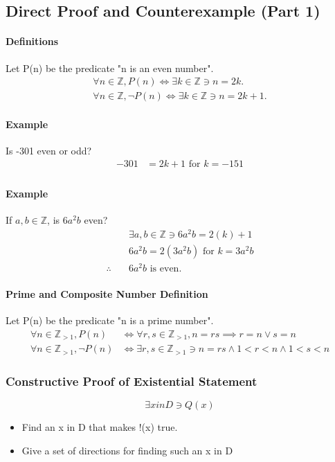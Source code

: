 \subsection{Direct Proof and Counterexample (Part 1)}
\hrulefill

\paragraph*{Definitions}
Let P(n) be the predicate "n is an even number".
\begin{align*}
    \forall n \in \mathbb{Z}, P(n) \iff \exists k \in \mathbb{Z} \ni n = 2k.\\
    \forall n \in \mathbb{Z}, \neg P(n) \iff \exists k \in \mathbb{Z} \ni n = 2k + 1.
\end{align*}

\paragraph*{Example}
Is -301 even or odd?
\begin{align*}
    -301 &= 2k + 1 \text{ for } k=-151\\
\end{align*}

\paragraph*{Example}
If $a, b \in \mathbb{Z}$, is $6a^2b$ even?
\begin{align*}
    &\exists a, b \in \mathbb{Z} \ni 6a^2b = 2(k) + 1 \\
    &6a^2b = 2(3a^2b) \text{ for } k=3a^2b\\
    \therefore \quad &6a^2b \text{ is even.}
\end{align*}

\paragraph*{Prime and Composite Number Definition}
Let P(n) be the predicate "n is a prime number".
\begin{align*}
    \forall n \in \mathbb{Z}_{>1}, P(n) &\iff \forall r, s \in \mathbb{Z}_{>1}, n=rs \implies r=n \lor s=n\\
    \forall n \in \mathbb{Z}_{>1}, \neg P(n) &\iff \exists r, s \in \mathbb{Z}_{>1} \ni n=rs \land 1 < r < n \land 1 < s < n
\end{align*}

\subsubsection*{Constructive Proof of Existential Statement}
\begin{equation*}
    \exists x in D \ni Q(x)
\end{equation*}
\begin{itemize}
    \item Find an x in D that makes !(x) true.
    \item Give a set of directions for finding such an x in D
\end{itemize}

